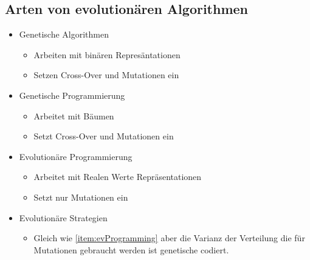     \subsection{Arten von evolutionären Algorithmen}
    \label{sub:artenEvAlgos}
      \begin{itemize}
        \item Genetische Algorithmen
          \begin{itemize}
            \item Arbeiten mit binären Represäntationen
            \item Setzen Cross-Over und Mutationen ein
          \end{itemize}
        \item Genetische Programmierung
          \begin{itemize}
            \item Arbeitet mit Bäumen
            \item Setzt Cross-Over und Mutationen ein
          \end{itemize}
        \item Evolutionäre Programmierung
        \label{item:evProgramming}
          \begin{itemize}
            \item Arbeitet mit Realen Werte Repräsentationen
            \item Setzt nur Mutationen ein
          \end{itemize}
        \item Evolutionäre Strategien
          \begin{itemize}
            \item Gleich wie \ref{item:evProgramming} aber die Varianz der Verteilung die für Mutationen gebraucht werden ist genetische codiert.
          \end{itemize}
      \end{itemize}
